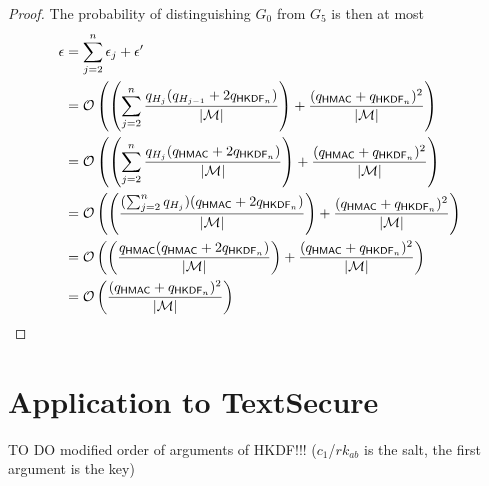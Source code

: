 \documentclass[compsoc, conference, letterpaper, 10pt, times]{IEEEtran}
\newcommand{\HKDF}{\mathsf{HKDF}}
\newcommand{\rk}{\mathit{rk}}
\newcommand{\hmac}{\mathsf{HMAC}}
\newcommand{\Smac}{\mathcal{M}}
\begin{document}
\begin{proof}
The probability of distinguishing $G_0$ from $G_5$ is then
at most 
\begin{align*}
\epsilon &= \sum_{j=2}^n \epsilon_j + \epsilon' \\
&= {\cal O}\left(\left(\sum_{j=2}^n \frac{q_{H_{j}}(q_{H_{j-1}} + 2q_{\HKDF_n})}{|\Smac|} \right) + \frac{(q_{\hmac} + q_{\HKDF_n})^2}{|\Smac|}\right)\\
&= {\cal O}\left(\left(\sum_{j=2}^n \frac{q_{H_{j}}(q_{\hmac} + 2q_{\HKDF_n})}{|\Smac|} \right) + \frac{(q_{\hmac} + q_{\HKDF_n})^2}{|\Smac|}\right)\\
&= {\cal O}\left(\left(\frac{(\sum_{j=2}^nq_{H_{j}})(q_{\hmac} + 2 q_{\HKDF_n})}{|\Smac|} \right) + \frac{(q_{\hmac} + q_{\HKDF_n})^2}{|\Smac|}\right)\\
&= {\cal O}\left(\left(\frac{q_{\hmac}(q_{\hmac} + 2 q_{\HKDF_n})}{|\Smac|} \right) + \frac{(q_{\hmac} + q_{\HKDF_n})^2}{|\Smac|}\right)\\
&= {\cal O}\left(\frac{(q_{\hmac} + q_{\HKDF_n})^2}{|\Smac|}\right)\\
\end{align*}
\end{proof}


\section{Application to TextSecure}

TO DO modified order of arguments of HKDF!!! ($c_1$/$\rk_{ab}$ is the salt,
the first argument is the key)
\end{document}
